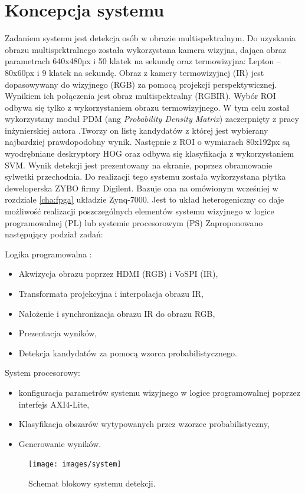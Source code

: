 \section{Koncepcja systemu}
Zadaniem systemu jest detekcja osób w obrazie multispektralnym. Do uzyskania obrazu multisprktralnego została wykorzystana kamera wizyjna, dająca obraz parametrach 640x480px i 50 klatek na sekundę oraz termowizyjna: Lepton – 80x60px i 9 klatek na sekundę. Obraz z kamery termowizyjnej (IR) jest dopasowywany do wizyjnego (RGB) za pomocą projekcji perspektywicznej. Wynikiem ich połączenia jest obraz multispektralny (RGBIR). Wybór ROI odbywa się tylko z wykorzystaniem obrazu termowizyjnego. W tym celu został wykorzystany moduł PDM (ang \textit{Probability Density Matrix}) zaczerpnięty z pracy inżynierskiej autora \cite{kankaing}.Tworzy on listę kandydatów z której jest wybierany najbardziej prawdopodobny wynik. Następnie z ROI o wymiarach 80x192px są wyodrębniane deskryptory HOG oraz odbywa się klasyfikacja z wykorzystaniem SVM. Wynik detekcji jest prezentowany na ekranie, poprzez obramowanie sylwetki przechodnia.
Do realizacji tego systemu została wykorzystana płytka deweloperska ZYBO firmy Digilent. Bazuje ona na omówionym wcześniej w rozdziale \ref{cha:fpga} układzie Zynq-7000. Jest to układ heterogeniczny co daje możliwość realizacji poszczególnych elementów systemu wizyjnego w logice programowalnej (PL) lub systemie procesorowym (PS) 
Zaproponowano następujący podział zadań:

Logika programowalna :
\begin{itemize}
\item Akwizycja obrazu poprzez HDMI (RGB) i VoSPI (IR),
\item Transformata projekcyjna i interpolacja obrazu IR,
\item Nałożenie i synchronizacja obrazu IR do obrazu RGB,
\item Prezentacja wyników,
\item Detekcja kandydatów za pomocą wzorca probabilistycznego.
\end{itemize}
System procesorowy:
\begin{itemize}
\item konfiguracja parametrów systemu wizyjnego w logice programowalnej poprzez interfejs AXI4-Lite,
\item Klasyfikacja obszarów wytypowanych przez wzorzec probabilistyczny,
\item Generowanie wyników.
\end{itemize}
\begin{figure}[h]
    \centering
    \texttt{[image: images/system]}
    \caption{Schemat blokowy systemu detekcji.}
    \label{fig:systemwizyjny}
\end{figure}

